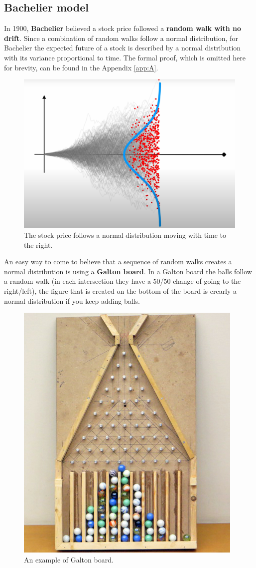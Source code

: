\subsection{Bachelier model}
In 1900, \textbf{Bachelier} believed a stock price followed a \textbf{random walk with no drift}. Since a combination of random walks follow a normal distribution, for Bachelier the expected future of a stock is described by a normal distribution with its variance proportional to time. The formal proof, which is omitted here for brevity, can be found in the Appendix \ref{app:A}.
\begin{figure} [H]
    \centering
    \includegraphics[width=0.5\linewidth]{img/Bachelier.png}
    \caption{The stock price follows a normal distribution moving with time to the right.}
\end{figure}
An easy way to come to believe that a sequence of random walks creates a normal distribution is using a \textbf{Galton board}. In a Galton board the balls follow a random walk (in each intersection they have a 50/50 change of going to the right/left), the figure that is created on the bottom of the board is crearly a normal distribution if you keep adding balls.
\begin{figure} [H]
    \centering
    \includegraphics[width=0.5\linewidth]{img/Galton_Board_5.jpeg}
    \caption{An example of Galton board.}
\end{figure}
